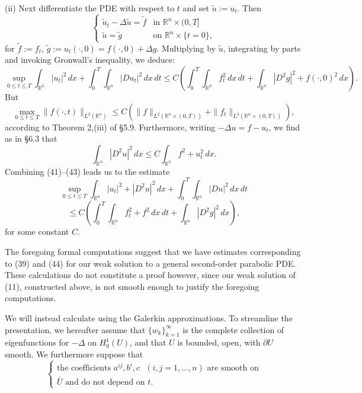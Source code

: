 \begin{remark}
(ii) Next differentiate the PDE with respect to $t$ and set $\tilde{u} := u_t$. Then
\[
\begin{cases}
\tilde{u}_t - \Delta \tilde{u} = \tilde{f} & \text{in } \mathbb{R}^n \times (0,T] \\
\tilde{u} = \tilde{g} & \text{on } \mathbb{R}^n \times \{t = 0\},
\end{cases}
\tag{40}
\]
for $\tilde{f} := f_t$, $\tilde{g} := u_t(\cdot, 0) = f(\cdot, 0) + \Delta g$. Multiplying by $\tilde{u}$, integrating by parts and invoking Gronwall's inequality, we deduce:
\[
\sup_{0 \leq t \leq T} \int_{\mathbb{R}^n} |u_t|^2 \, dx + \int_0^T \int_{\mathbb{R}^n} |Du_t|^2 \, dx\,dt \leq C \left(\int_0^T \int_{\mathbb{R}^n} f_t^2 \, dx\,dt + \int_{\mathbb{R}^n} |D^2g|^2 + f(\cdot, 0)^2 \, dx \right).
\tag{41}
\]
But
\[
\max_{0 \leq t \leq T} \|f(\cdot, t)\|_{L^2(\mathbb{R}^n)} \leq C(\|f\|_{L^2(\mathbb{R}^n \times (0,T))} + \|f_t\|_{L^2(\mathbb{R}^n \times (0,T))}),
\tag{42}
\]
according to Theorem 2,(iii) of \S5.9. Furthermore, writing $-\Delta u = f - u_t$, we find as in \S6.3 that
\[
\int_{\mathbb{R}^n} |D^2u|^2 \, dx \leq C \int_{\mathbb{R}^n} f^2 + u_t^2 \, dx.
\tag{43}
\]
Combining (41)--(43) leads us to the estimate
\[
\sup_{0 \leq t \leq T} \int_{\mathbb{R}^n} |u_t|^2 + |D^2u|^2 \, dx + \int_0^T \int_{\mathbb{R}^n} |Du|^2 \, dx\,dt
\]
\[
\leq C \left( \int_0^T \int_{\mathbb{R}^n} f_t^2 + f^2 \, dx\,dt + \int_{\mathbb{R}^n} |D^2 g|^2 \, dx \right),
\tag{44}
\]
for some constant $C$.

The foregoing formal computations suggest that we have estimates corresponding to (39) and (44) for our weak solution to a general second-order parabolic PDE. These calculations do not constitute a proof however, since our weak solution of (11), constructed above, is not smooth enough to justify the foregoing computations.
\end{remark}

We will instead calculate using the Galerkin approximations. To streamline the presentation, we hereafter assume that $\{w_k\}_{k=1}^\infty$ is the complete collection of eigenfunctions for $-\Delta$ on $H_0^1(U)$, and that $U$ is bounded, open, with $\partial U$ smooth. We furthermore suppose that
\[
\begin{cases} \text{the coefficients } a^{ij}, b^i, c \text{ } (i,j = 1, \ldots, n) \text{ are smooth on} \\ \bar{U} \text{ and do not depend on } t. \end{cases}
\tag{45}
\]

